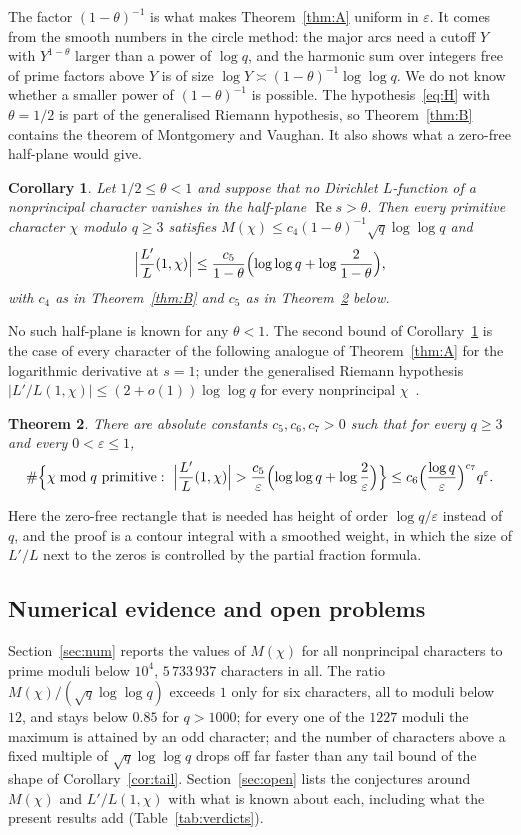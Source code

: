 \documentclass[11pt,a4paper,reqno]{amsart}
\newtheorem{theorem}{Theorem}[section]
\newtheorem{corollary}[theorem]{Corollary}
\theoremstyle{remark}
\numberwithin{equation}{section}
\renewcommand{\Re}{\operatorname{Re}}
\newcommand{\eps}{\varepsilon}
\begin{document}
The factor $(1-\theta)^{-1}$ is what makes Theorem~\ref{thm:A} uniform in $\eps$. It comes from the smooth numbers in the circle method: the major arcs need a cutoff $Y$ with $Y^{1-\theta}$ larger than a power of $\log q$, and the harmonic sum over integers free of prime factors above $Y$ is of size $\log Y\asymp(1-\theta)^{-1}\log\log q$. We do not know whether a smaller power of $(1-\theta)^{-1}$ is possible. The hypothesis~\eqref{eq:H} with $\theta=1/2$ is part of the generalised Riemann hypothesis, so Theorem~\ref{thm:B} contains the theorem of Montgomery and Vaughan. It also shows what a zero-free half-plane would give.

\begin{corollary}\label{cor:half}
Let $1/2\le\theta<1$ and suppose that no Dirichlet $L$-function of a nonprincipal character vanishes in the half-plane $\Re s>\theta$. Then every primitive character $\chi$ modulo $q\ge3$ satisfies $M(\chi)\le c_4(1-\theta)^{-1}\sqrt q\log\log q$ and
\[
  \Bigl|\frac{L'}{L}(1,\chi)\Bigr|\le\frac{c_5}{1-\theta}\Bigl(\log\log q+\log\frac2{1-\theta}\Bigr),
\]
with $c_4$ as in Theorem~\ref{thm:B} and $c_5$ as in Theorem~\ref{thm:C} below.
\end{corollary}

No such half-plane is known for any $\theta<1$. The second bound of Corollary~\ref{cor:half} is the case of every character of the following analogue of Theorem~\ref{thm:A} for the logarithmic derivative at $s=1$; under the generalised Riemann hypothesis $|L'/L(1,\chi)|\le(2+o(1))\log\log q$ for every nonprincipal $\chi$~\cite{IMS09}.

\begin{theorem}\label{thm:C}
There are absolute constants $c_5,c_6,c_7>0$ such that for every $q\ge3$ and every $0<\eps\le1$,
\[
  \#\Bigl\{\chi\bmod q\ \text{primitive}:\ \Bigl|\frac{L'}{L}(1,\chi)\Bigr|>\frac{c_5}{\eps}\Bigl(\log\log q+\log\frac2\eps\Bigr)\Bigr\}
  \le c_6\Bigl(\frac{\log q}{\eps}\Bigr)^{c_7}q^{\eps}.
\]
\end{theorem}

Here the zero-free rectangle that is needed has height of order $\log q/\eps$ instead of $q$, and the proof is a contour integral with a smoothed weight, in which the size of $L'/L$ next to the zeros is controlled by the partial fraction formula.

\subsection*{Numerical evidence and open problems}
Section~\ref{sec:num} reports the values of $M(\chi)$ for all nonprincipal characters to prime moduli below $10^4$, $5\,733\,937$ characters in all. The ratio $M(\chi)/(\sqrt q\log\log q)$ exceeds $1$ only for six characters, all to moduli below $12$, and stays below $0.85$ for $q>1000$; for every one of the $1227$ moduli the maximum is attained by an odd character; and the number of characters above a fixed multiple of $\sqrt q\log\log q$ drops off far faster than any tail bound of the shape of Corollary~\ref{cor:tail}. Section~\ref{sec:open} lists the conjectures around $M(\chi)$ and $L'/L(1,\chi)$ with what is known about each, including what the present results add (Table~\ref{tab:verdicts}).
\end{document}
